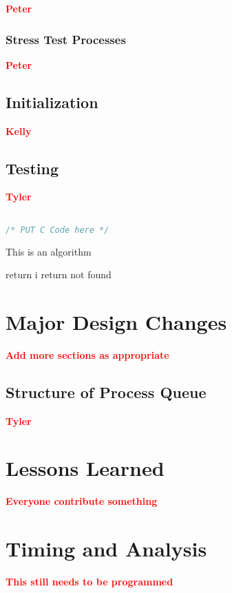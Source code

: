\documentclass[12pt]{report}
\begin{document}
\textcolor{red}{\textbf{Peter}} \\

\subsection{Stress Test Processes}

\textcolor{red}{\textbf{Peter}} \\



\section{Initialization}

\textcolor{red}{\textbf{Kelly}} \\



\section{Testing}

\textcolor{red}{\textbf{Tyler}} \\


\begin{minipage}{\textwidth}
\begin{lstlisting}[language=C, frame=single]

/* PUT C Code here */

\end{lstlisting}
\end{minipage}

\begin{algorithm}
  \caption{This is an algorithm}
  \begin{algorithmic}[1]
          \State return i
        \EndIf
      \EndFor
    \State return not found
    \EndFunction
  \end{algorithmic}
\end{algorithm}

\chapter{Major Design Changes}

\textcolor{red}{\textbf{Add more sections as appropriate}} \\

\section{Structure of Process Queue}

\textcolor{red}{\textbf{Tyler}} \\




\chapter{Lessons Learned}

\textcolor{red}{\textbf{Everyone contribute something}} \\


\chapter{Timing and Analysis}

\textcolor{red}{\textbf{This still needs to be programmed}} \\
\end{document}
